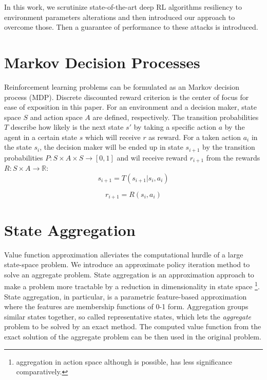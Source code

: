 \documentclass{article}
\begin{document}
    In this work, we scrutinize state-of-the-art deep RL algorithms resiliency to environment parameters alterations
    and then introduced our approach to overcome those. Then a guarantee of performance to these attacks is introduced.

    \section{Markov Decision Processes}
    Reinforcement learning problems can be formulated as an Markov decision process (MDP)\cite{Puterman1994}.
    Discrete discounted reward criterion is the center of focus for ease of exposition in this paper.
    For an environment and a decision maker, state space $S$ and action space $A$ are defined, respectively.
    The transition probabilities $T$ describe how likely is the next state $s'$ by taking a specific action $a$ by
    the agent in a certain state $s$ which will receive $r$ as reward.
    For a taken action $a_i$ in the state $s_i$, the decision maker will be ended up in state $s_{i+1}$ by the
    transition probabilities $P : S \times A \times S \rightarrow [0, 1]$ and wil receive reward $r_{i+1}$ from the
    rewards $R : S \times A \rightarrow \mathbb{R}$: \\
    \begin{equation}
        s_{i+1} = T(s_{i+1}|s_i, a_i)
    \end{equation}

    \begin{equation}
        r_{i+1} = R(s_i, a_i)
    \end{equation}


    \section{State Aggregation}
    Value function approximation alleviates the computational hurdle of a large state-space problem.
    We introduce an approximate policy iteration method to solve an aggregate problem.
    State aggregation is an approximation approach to make a problem more tractable by a reduction in dimensionality in
    state space \footnote{aggregation in action space although is possible, has less significance comparatively.}.
    State aggregation, in particular, is a parametric feature-based approximation where the features are membership
    functions of 0-1 form.
    Aggregation groups similar states together, so called representative states, which lets the \textit{aggregate}
    problem to be solved by an exact method.
    The computed value function from the exact solution of the aggregate problem can be then used in the original
    problem.
\end{document}
